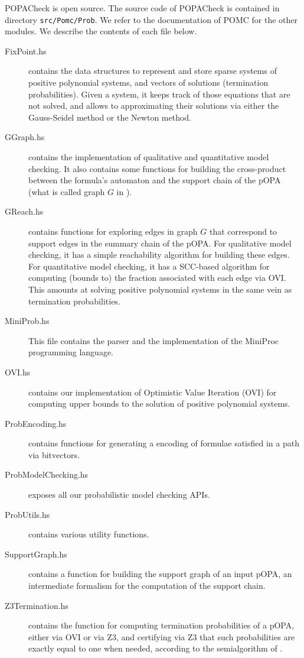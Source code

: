 \documentclass[9pt,a4paper]{article}
\begin{document}
POPACheck is open source. The source code of POPACheck is contained in directory \texttt{src/Pomc/Prob}. We refer to the documentation of POMC for the other modules.
We describe the contents of each file below.
\begin{description}
\item[FixPoint.hs] contains the data structures to represent and store sparse systems of positive polynomial systems, and vectors of solutions (termination probabilities). Given a system, it keeps track of those equations that are not solved, and allows to approximating their solutions via either the Gauss-Seidel method or the Newton method.
\item[GGraph.hs]  contains the implementation of qualitative and quantitative model checking. It also contains some functions for building the cross-product between the formula's automaton and the support chain of the pOPA (what is called graph $G$ in \cite{abs-2404-03515}).
\item[GReach.hs] contains functions for exploring edges in graph $G$ that correspond to support edges in the summary chain of the pOPA. For qualitative model checking, it has a simple reachability algorithm for building these edges. For quantitative model checking, it has a SCC-based algorithm for computing (bounds to) the fraction associated with each edge via OVI. This amounts at solving positive polynomial systems in the same vein as termination probabilities.
\item[MiniProb.hs] This file contains the parser and the implementation of the MiniProc programming language.
\item[OVI.hs] contains our implementation of Optimistic Value Iteration (OVI) for computing upper bounds to the solution of positive polynomial systems.
\item[ProbEncoding.hs] contains functions for generating a encoding of formulae satisfied in a path via bitvectors.
\item[ProbModelChecking.hs] exposes all our probabilistic model checking APIs.
\item[ProbUtils.hs] contains various utility functions.
\item[SupportGraph.hs] contains a function for building the support graph of an input pOPA, an intermediate formalism for the computation of the support chain. 
\item[Z3Termination.hs] contains the function for computing termination probabilities of a pOPA, either via OVI or via Z3, and certifying via Z3 that such probabilities are exactly equal to one when needed, according to the semialgorithm of \cite{POPACheck}. 

\end{description}
\end{document}
